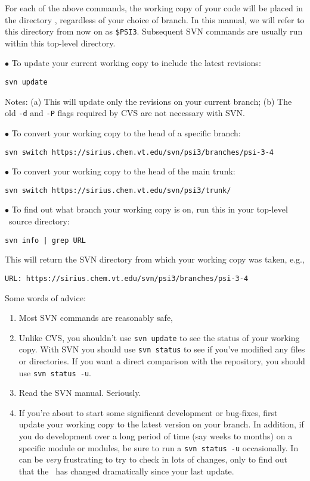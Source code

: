 \noindent For each of the above commands, the working copy of your
code will be placed in the directory , regardless of your
choice of branch.  In this manual, we will refer to this directory
from now on as {\tt \$PSI3}.  Subsequent SVN commands are usually run
within this top-level directory.

\noindent
$\bullet$ To update your current working copy to include the latest revisions:

{\tt svn update}

\noindent
Notes: (a) This will update only the revisions on your current branch;
(b) The old {\tt -d} and {\tt -P} flags required by CVS are not necessary with SVN. 

\noindent
$\bullet$ To convert your working copy to the head of a specific branch:

{\tt svn switch https://sirius.chem.vt.edu/svn/psi3/branches/psi-3-4}

\noindent
$\bullet$ To convert your working copy to the head of the main trunk:

{\tt svn switch https://sirius.chem.vt.edu/svn/psi3/trunk/}

\noindent
$\bullet$ To find out what branch your working copy is on, run this in your
top-level \PSIthree\ source directory:

{\tt svn info | grep URL}

\noindent
This will return the SVN directory from which your working copy was
taken, e.g.,

\noindent
{\tt URL: https://sirius.chem.vt.edu/svn/psi3/branches/psi-3-4}

\noindent
Some words of advice:
\begin{enumerate}
\item Most SVN commands are reasonably safe, 

\item Unlike CVS, you shouldn't use {\tt svn update} to see the status
  of your working copy.  With SVN you should use {\tt svn status} to
  see if you've modified any files or directories.  If you want a
  direct comparison with the repository, you should use {\tt svn status -u}.
\item Read the SVN manual.  Seriously.
\begin{center}
\end{center}
\item If you're about to start some significant development or bug-fixes,
first update your working copy to the latest version on your branch.
In addition, if you do development over a long period of time (say weeks to
months) on a specific module or modules, be sure to run a {\tt svn status -u}
occasionally. In can be {\em very} frustrating to try to check in lots
of changes, only to find out that the \PSIthree\ has changed dramatically
since your last update.
\end{enumerate}

